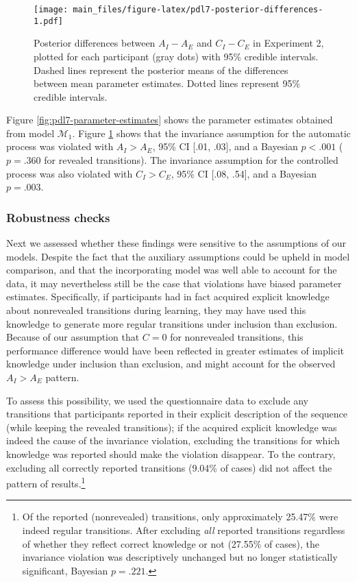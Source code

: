 \documentclass[floatsintext,doc]{apa6}
\theoremstyle{definition}
\theoremstyle{definition}
\theoremstyle{definition}
\theoremstyle{remark}
\begin{document}
\begin{figure}
\centering
\texttt{[image: main\_files/figure-latex/pdl7-posterior-differences-1.pdf]}
\caption{\label{fig:pdl7-posterior-differences}Posterior differences between
\(A_I - A_E\) and \(C_I - C_E\) in Experiment 2, plotted for each
participant (gray dots) with 95\% credible intervals. Dashed lines
represent the posterior means of the differences between mean parameter
estimates. Dotted lines represent 95\% credible intervals.}
\end{figure}

Figure \ref{fig:pdl7-parameter-estimates} shows the parameter estimates
obtained from model \(\mathcal{M}_1\). Figure
\ref{fig:pdl7-posterior-differences} shows that the invariance
assumption for the automatic process was violated with \(A_I > A_E\),
95\% CI {[}.01, .03{]}, and a Bayesian \(p < .001\) (\(p = .360\) for
revealed transitions). The invariance assumption for the controlled
process was also violated with \(C_I > C_E\), 95\% CI {[}.08, .54{]},
and a Bayesian \(p = .003\).

\subsubsection{Robustness checks}\label{robustness-checks}

Next we assessed whether these findings were sensitive to the
assumptions of our models. Despite the fact that the auxiliary
assumptions could be upheld in model comparison, and that the
incorporating model was well able to account for the data, it may
nevertheless still be the case that violations have biased parameter
estimates. Specifically, if participants had in fact acquired explicit
knowledge about nonrevealed transitions during learning, they may have
used this knowledge to generate more regular transitions under inclusion
than exclusion. Because of our assumption that \(C = 0\) for nonrevealed
transitions, this performance difference would have been reflected in
greater estimates of implicit knowledge under inclusion than exclusion,
and might account for the observed \(A_{I} > A_{E}\) pattern.

To assess this possibility, we used the questionnaire data to exclude
any transitions that participants reported in their explicit description
of the sequence (while keeping the revealed transitions); if the
acquired explicit knowledge was indeed the cause of the invariance
violation, excluding the transitions for which knowledge was reported
should make the violation disappear. To the contrary, excluding all
correctly reported transitions (9.04\% of cases) did not affect the
pattern of results.\footnote{Of the reported (nonrevealed) transitions,
  only approximately 25.47\% were indeed regular transitions. After
  excluding \emph{all} reported transitions regardless of whether they
  reflect correct knowledge or not (27.55\% of cases), the invariance
  violation was descriptively unchanged but no longer statistically
  significant, Bayesian \(p = .221\).}
\end{document}
